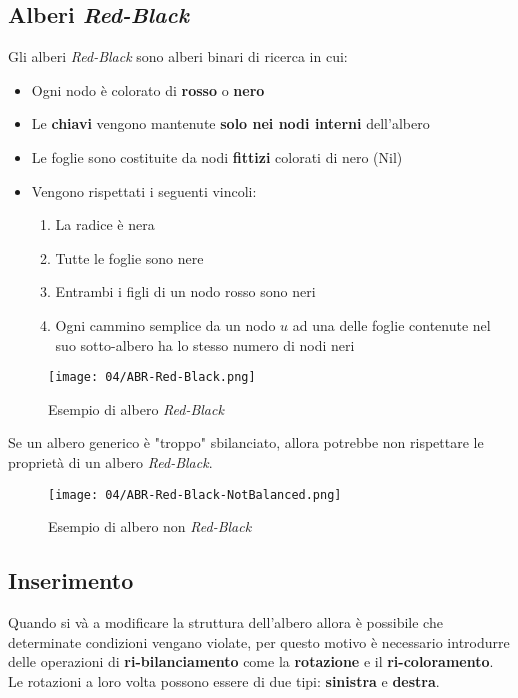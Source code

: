     \subsection{Alberi \textit{Red-Black}}
        Gli alberi \textit{Red-Black} sono alberi binari di ricerca in cui:
        \begin{itemize}
            \item Ogni nodo è colorato di \textbf{rosso} o \textbf{nero}
            \item Le \textbf{chiavi} vengono mantenute \textbf{solo nei nodi interni} dell'albero
            \item Le foglie sono costituite da nodi \textbf{fittizi} colorati di nero (Nil)
            \item Vengono rispettati i seguenti vincoli:\begin{enumerate}
                \item La radice è nera
                \item Tutte le foglie sono nere
                \item Entrambi i figli di un nodo rosso sono neri
                \item Ogni cammino semplice da un nodo $u$ ad una delle foglie contenute nel suo sotto-albero ha lo stesso numero di nodi neri
            \end{enumerate}
        \end{itemize}
        \begin{figure}[H]
            \centering
            \texttt{[image: 04/ABR-Red-Black.png]}
            \caption{Esempio di albero \textit{Red-Black}}
        \end{figure}
        Se un albero generico è "troppo" sbilanciato, allora potrebbe non rispettare le proprietà di un albero \textit{Red-Black}.
        \begin{figure}
            \centering
            \texttt{[image: 04/ABR-Red-Black-NotBalanced.png]}
            \caption{Esempio di albero non \textit{Red-Black}}
        \end{figure}
    \subsection{Inserimento}
        Quando si và a modificare la struttura dell'albero allora è possibile che determinate condizioni vengano violate, per questo motivo è necessario introdurre delle operazioni di \textbf{ri-bilanciamento} come la \textbf{rotazione} e il \textbf{ri-coloramento}. Le rotazioni a loro volta possono essere di due tipi: \textbf{sinistra} e \textbf{destra}.
